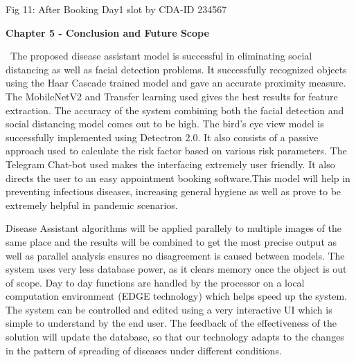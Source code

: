 \documentclass[12pt]{article}
\begin{document}

\begin{Center}
 
\end{Center}
\begin{Center}
Fig 11: After Booking Day1 slot by CDA-ID 234567
\end{Center}
\begin{Center}
 {\fontsize{18pt}{21.6pt}\selectfont \textbf{Chapter 5 - Conclusion and Future Scope}}
\end{Center}
\vspace{\baselineskip}
\vspace{\baselineskip}
\setlength{\parskip}{0.0pt}
\begin{justify}
\ The proposed disease assistant model is successful in eliminating social distancing as well as facial detection problems. It successfully recognized objects using the Haar Cascade trained model and gave an accurate proximity measure. The MobileNetV2 and Transfer learning used gives the best results for feature extraction. The accuracy of the system combining both the facial detection and social distancing model comes out to be high. The bird's eye view model is successfully implemented using Detectron 2.0.  It also consists of a passive approach used to calculate the risk factor based on various risk parameters. The Telegram Chat-bot used makes the interfacing extremely user friendly. It also directs the user to an easy appointment booking software.This model will help in preventing infectious diseases, increasing general hygiene as well as prove to be extremely helpful in pandemic scenarios. 
\end{justify}

\vspace{\baselineskip}
\setlength{\parskip}{9.96pt}
\setlength{\parskip}{0.0pt}
\begin{justify}
 Disease Assistant algorithms will be applied parallely to multiple images of the same place and the results will be combined to get the most precise output as well as parallel analysis ensures no disagreement is caused between models. The system uses very less database power, as it clears memory once the object is out of scope. Day to day functions are handled by the processor on a local computation environment (EDGE technology) which helps speed up the system. The system can be controlled and edited using a very interactive UI which is simple to understand by the end user. The feedback of the effectiveness of the solution will update the database, so that our technology adapts to the changes in the pattern of spreading of diseases under different conditions. 
\end{justify}
\end{document}
